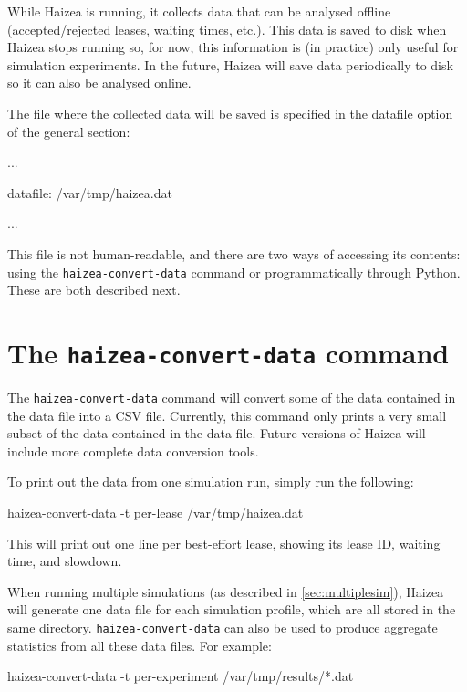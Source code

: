 While Haizea is running, it collects data that can be analysed offline (accepted/rejected leases, waiting times, etc.). This data is saved to disk when Haizea stops running so, for now, this information is (in practice) only useful for simulation experiments. In the future, Haizea will save data periodically to disk so it can also be analysed online.

The file where the collected data will be saved is specified in the datafile option of the general section:

\begin{wideshellverbatim}
[general]
...

datafile: /var/tmp/haizea.dat

...
\end{wideshellverbatim}

This file is not human-readable, and there are two ways of accessing its contents: using the \texttt{haizea-convert-data} command or programmatically through Python. These are both described next.


\section{The \texttt{haizea-convert-data} command}

The \texttt{haizea-convert-data} command will convert some of the data contained in the data file into a CSV file. Currently, this command only prints a very small subset of the data contained in the data file. Future versions of Haizea will include more complete data conversion tools.

To print out the data from one simulation run, simply run the following: 

\begin{shellverbatim}
haizea-convert-data -t per-lease /var/tmp/haizea.dat
\end{shellverbatim}

This will print out one line per best-effort lease, showing its lease ID, waiting time, and slowdown. 

When running multiple simulations (as described in \ref{sec:multiplesim}), Haizea will generate one data file for each simulation profile, which are all stored in the same directory. \texttt{haizea-convert-data} can also be used to produce aggregate statistics from all these data files. For example:

\begin{shellverbatim}
haizea-convert-data -t per-experiment /var/tmp/results/*.dat
\end{shellverbatim}

